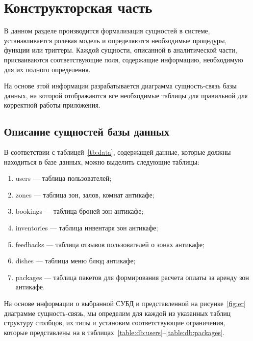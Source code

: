 \chapter{Конструкторская часть}

В данном разделе производится формализация сущностей в системе, устанавливается ролевая модель и определяются необходимые процедуры, функции или триггеры. Каждой сущности, описанной в аналитической части, присваиваются соответствующие поля, содержащие информацию, необходимую для их полного определения. 

На основе этой информации разрабатывается диаграмма сущность-связь базы данных, на которой отображаются все необходимые таблицы для правильной для корректной работы приложения.

\section{Описание сущностей базы данных}

В соответствии с таблицей~\ref{tb:data}, содержащей данные, которые должны находиться в базе данных, можно выделить следующие таблицы:
\begin{enumerate}
	\item users --- таблица пользователей;
	\item zones --- таблица зон, залов, комнат антикафе;
	\item bookings --- таблица броней зон антикафе;
	\item inventories --- таблица инвентаря зон антикафе;
	\item feedbacks --- таблица отзывов пользователей о зонах антикафе;
	\item dishes --- таблица меню блюд антикафе;
	\item packages --- таблица пакетов для формирования расчета оплаты за аренду зон антикафе.
\end{enumerate}

На основе информации о выбранной СУБД и представленной на рисунке~\ref{fig:er} диаграмме сущность-связь, мы определим для каждой из указанных таблиц структуру столбцов, их типы и установим соответствующие ограничения, которые представлены на в таблицах~\ref{table:db:users}--\ref{table:db:packages}.

